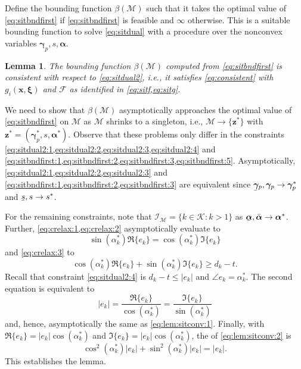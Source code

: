 \documentclass[a4paper,10pt,journal]{IEEEtran}
\let\vec\bm
\newcommand{\ubar}[1]{\underaccent{\bar}{#1}}
\newtheorem{lemma}{Lemma}
\begin{document}
Define the bounding function $\beta(\mathcal M)$ such that it takes the optimal value of \cref{eq:sitbndfirst} if \cref{eq:sitbndfirst} is feasible and $\infty$ otherwise.
This is a suitable bounding function to solve \cref{eq:sitdual} with a  procedure over the nonconvex variables $\vec{\gamma}_p, s, \vec\alpha$.
\begin{lemma} \label{lem:consist}
	The bounding function $\beta(\mathcal M)$ computed from \cref{eq:sitbndfirst} is consistent with respect to \cref{eq:sitdual2}, i.e., it satisfies \cref{eq:consistent} with $g_i(\vec x, \vec \xi)$ and $\mathcal F$ as identified in \cref{eq:sitf,eq:sitg}.
\end{lemma}
\begin{IEEEproof}
	We need to show that $\beta(\mathcal M)$ asymptotically approaches the optimal value of \cref{eq:sitbndfirst} on $\mathcal M$ as $\mathcal M$ shrinks to a singleton, i.e., $\mathcal M \rightarrow \{ \vec z^* \}$ with $\vec z^* = (\vec\gamma_p^*, s, \vec\alpha^*)$. Observe that these problems only differ in the constraints \cref{eq:sitdual2:1,eq:sitdual2:2,eq:sitdual2:3,eq:sitdual2:4} and \cref{eq:sitbndfirst:1,eq:sitbndfirst:2,eq:sitbndfirst:3,eq:sitbndfirst:5}. Asymptotically, \cref{eq:sitdual2:1,eq:sitdual2:2,eq:sitdual2:3} and \cref{eq:sitbndfirst:1,eq:sitbndfirst:2,eq:sitbndfirst:3} are equivalent since $\ubar{\vec\gamma}_p, \vec\gamma_p \rightarrow \vec\gamma_p^*$ and $\ubar{s}, s \rightarrow s^*$.

	For the remaining constraints, note that $\mathcal I_{\mathcal M} = \{ k\in\mathcal K: k > 1\}$ as $\ubar{\vec\alpha}, \bar{\vec\alpha} \rightarrow \vec\alpha^*$. Further, \cref{eq:crelax:1,eq:crelax:2} asymptotically evaluate to
	\begin{equation} \label{eq:lem:sitconv:1}
		\sin(\alpha_k^*) \Re\{e_k\} = \cos(\alpha_k^*) \Im\{e_k\}
	\end{equation}
	and \cref{eq:crelax:3} to
	\begin{equation} \label{eq:lem:sitconv:2}
		\cos(\alpha_k^*) \Re\{e_k\} + \sin(\alpha_k^*) \Im\{e_k\} \ge d_k - t.
	\end{equation}
	Recall that constraint \cref{eq:sitdual2:4} is $d_k - t \le | e_k |$ and $\angle e_k = \alpha_k^*$. The second equation is equivalent to
	\begin{equation}
		| e_k | = \frac{\Re\{ e_k \}}{\cos(\alpha_k^*)} = \frac{\Im\{ e_k \}}{\sin(\alpha_k^*)}
	\end{equation}
	and, hence, asymptotically the same as \cref{eq:lem:sitconv:1}.
	Finally, with $\Re\{e_k\} = |e_k| \cos(\alpha_k^*)$ and $\Im\{e_k\} = |e_k| \cos(\alpha_k^*)$, the  of \cref{eq:lem:sitconv:2} is
	\begin{equation}
		\cos^2(\alpha_k^*) | e_k | + \sin^2(\alpha_k^*) | e_k | = | e_k |.
	\end{equation}
	This establishes the lemma.
\end{IEEEproof}
\end{document}
